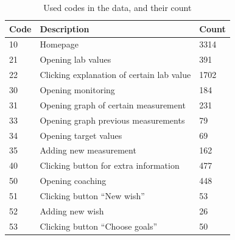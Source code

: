 \begin{table}[]
	\centering
	\caption{Used codes in the data, and their count}
	\label{table:codes}
	\begin{tabular}{@{}lll@{}}
		\toprule
		\textbf{Code} & \textbf{Description}                                                                              & \textbf{Count} \\ \midrule
		10            & Homepage                                                                                          & 3314           \\
		21            & Opening lab values                                                                                & 391            \\
		22            & Clicking explanation of certain lab value                                                         & 1702           \\
		30            & Opening monitoring                                                                                & 184            \\
		31            & Opening graph of certain measurement                                                              & 231            \\
		33            & Opening graph previous measurements                                                               & 79             \\
		34            & Opening target values                                                                             & 69             \\
		35            & Adding new measurement                                                                            & 162            \\
		40            & Clicking button for extra information                                                             & 477            \\
		50            & Opening coaching                                                                                  & 448            \\
		51            & Clicking button “New wish”                                                                        & 53             \\
		52            & Adding new wish                                                                                   & 26             \\
		53            & Clicking button “Choose goals”                                                                    & 50             \\

\end{tabular}
\end{table}
